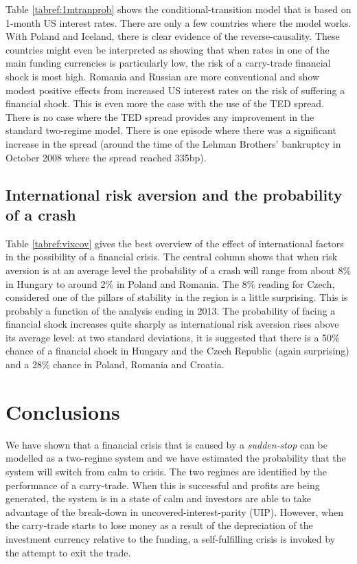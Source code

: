 \documentclass[12pt, a4paper, oneside]{article}\usepackage[]{graphicx}\usepackage[]{color}
\begin{document}
Table \ref{tabref:1mtranprob} shows the conditional-transition model that is based on 1-month US interest rates.  There are only a few countries where the model works.  With Poland and Iceland, there is clear evidence of the reverse-causality.  These countries might even be interpreted as showing that when rates in one of the main funding currencies is particularly low, the risk of a carry-trade financial shock is most high.  Romania and Russian are more conventional and show modest positive effects from increased US interest rates on the risk of suffering a financial shock.
This is even more the case with the use of the TED spread.  There is no case where the TED spread provides any improvement in the standard two-regime model.  There is one episode where there was a significant increase in the spread (around the time of the Lehman Brothers' bankruptcy in October 2008 where the spread reached 335bp).


\subsection{International risk aversion and the probability of a crash}
Table \ref{tabref:vixcov} gives the best overview of the effect of international factors in the possibility of a financial crisis.  The central column shows that when risk aversion is at an average level the probability of a crash will range from about 8\% in Hungary to around 2\% in Poland and Romania.  The 8\% reading for Czech, considered one of the pillars of stability in the region is a little surprising. This is probably a function of the analysis ending in 2013.  The probability of facing a financial shock increases quite sharply as international risk aversion rises above its average level: at two standard deviations, it is suggested that there is a 50\% chance of a financial shock in Hungary and the Czech Republic (again surprising) and a 28\% chance in Poland, Romania and Croatia. 


\section{Conclusions}\label{secred:con}
We have shown that a financial crisis that is caused by a \emph{sudden-stop} can be modelled as a two-regime system and we have estimated the probability that the system will switch from calm to crisis.  The two regimes are identified by the performance of a carry-trade.  When this is successful and profits are being generated, the system is in a state of calm and investors are able to take advantage of the break-down in uncovered-interest-parity (UIP).  However, when the carry-trade starts to lose money as a result of the depreciation of the investment currency relative to the funding, a self-fulfilling crisis is invoked by the attempt to exit the trade.  
\end{document}
